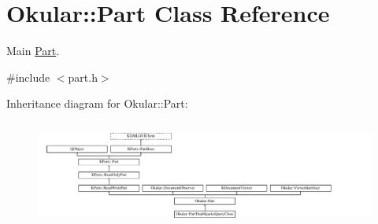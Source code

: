 \hypertarget{classOkular_1_1Part}{\section{Okular\+:\+:Part Class Reference}
\label{classOkular_1_1Part}
}


Main \hyperlink{classOkular_1_1Part}{Part}.  




{\ttfamily \#include $<$part.\+h$>$}

Inheritance diagram for Okular\+:\+:Part\+:\begin{figure}[H]
\begin{center}
\leavevmode
\includegraphics[height=3.563636cm]{classOkular_1_1Part}
\end{center}
\end{figure}
